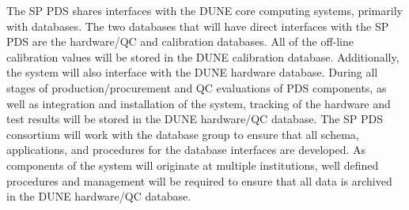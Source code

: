 


The SP PDS shares interfaces with the DUNE core computing systems, primarily with databases. The two databases that will have direct interfaces with the SP PDS are the hardware/QC and calibration databases. All of the off-line calibration values will be stored in the DUNE calibration database. Additionally, the system will also interface with the DUNE hardware database. During all stages of production/procurement and QC evaluations of PDS components, as well as integration and installation of the system, tracking of the hardware and test results will be stored in the DUNE hardware/QC database. The SP PDS consortium will work with the database group to ensure that all schema, applications, and procedures for the database interfaces are developed. As components of the system will originate at multiple institutions, well defined procedures and management will be required to ensure that all data is archived in the DUNE hardware/QC database. 


